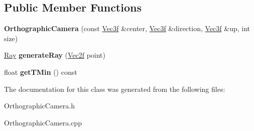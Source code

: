 \subsection*{\-Public \-Member \-Functions}
\begin{DoxyCompactItemize}
\item 
\hypertarget{classOrthographicCamera_a23c7fec8ea2f52dceee182e4d5d793c6}{{\bfseries \-Orthographic\-Camera} (const \hyperlink{classVec3f}{\-Vec3f} \&center, \hyperlink{classVec3f}{\-Vec3f} \&direction, \hyperlink{classVec3f}{\-Vec3f} \&up, int size)}\label{classOrthographicCamera_a23c7fec8ea2f52dceee182e4d5d793c6}

\item 
\hypertarget{classOrthographicCamera_a0d38d086463e985bebc1eeeb8ee1688c}{\hyperlink{classRay}{\-Ray} {\bfseries generate\-Ray} (\hyperlink{classVec2f}{\-Vec2f} point)}\label{classOrthographicCamera_a0d38d086463e985bebc1eeeb8ee1688c}

\item 
\hypertarget{classOrthographicCamera_a8e94c85d863b6e822c6dc41dd6c8c48d}{float {\bfseries get\-T\-Min} () const }\label{classOrthographicCamera_a8e94c85d863b6e822c6dc41dd6c8c48d}

\end{DoxyCompactItemize}


\-The documentation for this class was generated from the following files\-:\begin{DoxyCompactItemize}
\item 
\-Orthographic\-Camera.\-h\item 
\-Orthographic\-Camera.\-cpp\end{DoxyCompactItemize}
